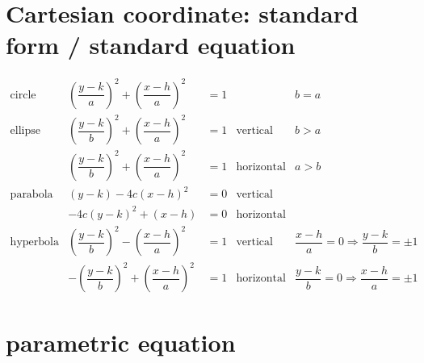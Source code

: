 \documentclass[
]{book}
\theoremstyle{definition}
\theoremstyle{definition}
\theoremstyle{definition}
\theoremstyle{definition}
\theoremstyle{remark}
\begin{document}
\section{Cartesian coordinate: standard form / standard equation}\label{cartesian-coordinate-standard-form-standard-equation}

\[
\begin{array}{ccccc}
\text{circle} & \left(\dfrac{y-k}{a}\right)^{2}+\left(\dfrac{x-h}{a}\right)^{2} & =1 &  & b=a\\
\text{ellipse} & \left(\dfrac{y-k}{b}\right)^{2}+\left(\dfrac{x-h}{a}\right)^{2} & =1 & \text{vertical} & b>a\\
 & \left(\dfrac{y-k}{b}\right)^{2}+\left(\dfrac{x-h}{a}\right)^{2} & =1 & \text{horizontal} & a>b\\
\text{parabola} & \left(y-k\right)-4c\left(x-h\right)^{2} & =0 & \text{vertical}\\
 & -4c\left(y-k\right)^{2}+\left(x-h\right) & =0 & \text{horizontal}\\
\text{hyperbola} & \left(\dfrac{y-k}{b}\right)^{2}-\left(\dfrac{x-h}{a}\right)^{2} & =1 & \text{vertical} & \dfrac{x-h}{a}=0\Rightarrow\dfrac{y-k}{b}=\pm1\\
 & -\left(\dfrac{y-k}{b}\right)^{2}+\left(\dfrac{x-h}{a}\right)^{2} & =1 & \text{horizontal} & \dfrac{y-k}{b}=0\Rightarrow\dfrac{x-h}{a}=\pm1
\end{array}
\]

\section{parametric equation}\label{parametric-equation}
\end{document}
